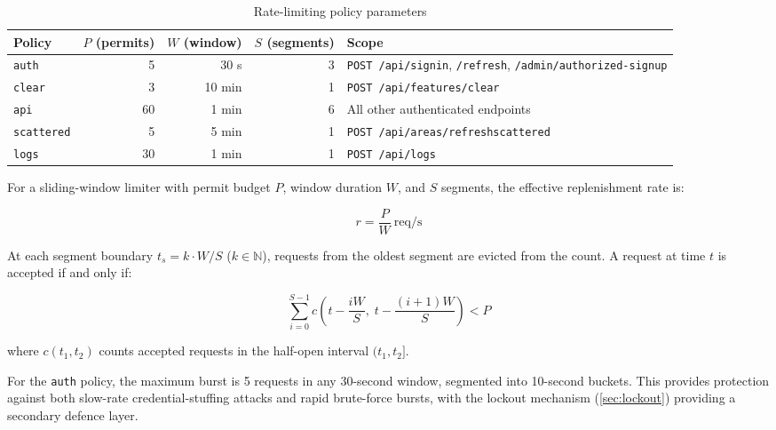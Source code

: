 \documentclass[12pt,a4paper]{article}
\theoremstyle{definition}
\theoremstyle{plain}
\theoremstyle{remark}
\newcommand{\N}{\mathbb{N}}
\begin{document}
\begin{table}[H]
\centering
\caption{Rate-limiting policy parameters}
\label{tab:rate_limits}
\begin{tabularx}{\textwidth}{lrrr>{\raggedright\arraybackslash}X}
\toprule
\textbf{Policy} & $P$ (permits) & $W$ (window) & $S$ (segments) & \textbf{Scope} \\
\midrule
\texttt{auth}      & 5  & 30 s  & 3 & \texttt{POST /api/signin}, \texttt{/refresh}, \texttt{/admin/authorized-signup} \\
\texttt{clear}     & 3  & 10 min & 1 & \texttt{POST /api/features/clear} \\
\texttt{api}       & 60 & 1 min & 6 & All other authenticated endpoints \\
\texttt{scattered} & 5  & 5 min & 1 & \texttt{POST /api\allowbreak/areas\allowbreak/refresh\-scattered} \\
\texttt{logs}      & 30 & 1 min & 1 & \texttt{POST /api/logs} \\
\bottomrule
\end{tabularx}
\end{table}

For a sliding-window limiter with permit budget $P$, window duration
$W$, and $S$ segments, the effective replenishment rate is:

\begin{equation}
  r = \frac{P}{W}\ \text{req/s}
  \label{eq:rate_replenishment}
\end{equation}

At each segment boundary $t_s = k \cdot W / S$ ($k \in \N$), requests
from the oldest segment are evicted from the count. A request at time $t$
is accepted if and only if:

\begin{equation}
  \sum_{i=0}^{S-1}
    c\!\left(t - \frac{iW}{S},\; t - \frac{(i+1)W}{S}\right)
  < P
  \label{eq:sliding_window}
\end{equation}

where $c(t_1, t_2)$ counts accepted requests in the half-open interval
$(t_1, t_2]$.

For the \texttt{auth} policy, the maximum burst is 5 requests in any
30-second window, segmented into 10-second buckets. This provides
protection against both slow-rate credential-stuffing attacks and rapid
brute-force bursts, with the lockout mechanism (\cref{sec:lockout})
providing a secondary defence layer.

\end{document}
